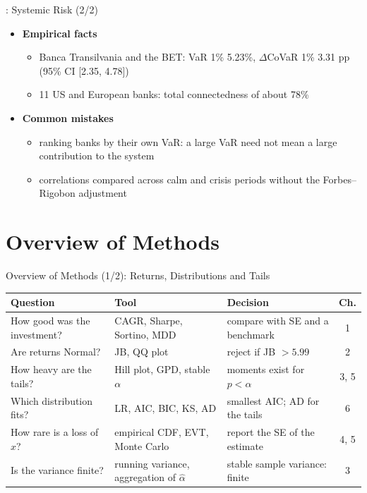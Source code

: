 \begin{frame}{: Systemic Risk (2/2)}
\itemsize{\small}
\begin{itemize}
    \item \textbf{Empirical facts}
    \begin{itemize}
        \item Banca Transilvania and the BET: VaR 1\% 5.23\%, $\Delta$CoVaR 1\% 3.31 pp (95\% CI [2.35, 4.78])
        \item 11 US and European banks: total connectedness of about 78\%
    \end{itemize}
    \item \textbf{Common mistakes}
    \begin{itemize}
        \item ranking banks by their own VaR: a large VaR need not mean a large contribution to the system
        \item correlations compared across calm and crisis periods without the Forbes--Rigobon adjustment
    \end{itemize}
\end{itemize}
\end{frame}


\section{Overview of Methods}

\begin{frame}{Overview of Methods (1/2): Returns, Distributions and Tails}
\itemsize{\small}
\begin{center}
\footnotesize
\begin{tabular}{>{\raggedright\arraybackslash}p{3.6cm}>{\raggedright\arraybackslash}p{3.4cm}>{\raggedright\arraybackslash}p{3.4cm}c}
\toprule
\textbf{Question} & \textbf{Tool} & \textbf{Decision} & \textbf{Ch.} \\
\midrule
How good was the investment? & CAGR, Sharpe, Sortino, MDD & compare with SE and a benchmark & 1 \\
Are returns Normal? & JB, QQ plot & reject if JB $> 5.99$ & 2 \\
How heavy are the tails? & Hill plot, GPD, stable $\alpha$ & moments exist for $p < \alpha$ & 3, 5 \\
Which distribution fits? & LR, AIC, BIC, KS, AD & smallest AIC; AD for the tails & 6 \\
How rare is a loss of $x$? & empirical CDF, EVT, Monte Carlo & report the SE of the estimate & 4, 5 \\
Is the variance finite? & running variance, aggregation of $\hat\alpha$ & stable sample variance: finite & 3 \\
\bottomrule
\end{tabular}
\end{center}
\end{frame}

